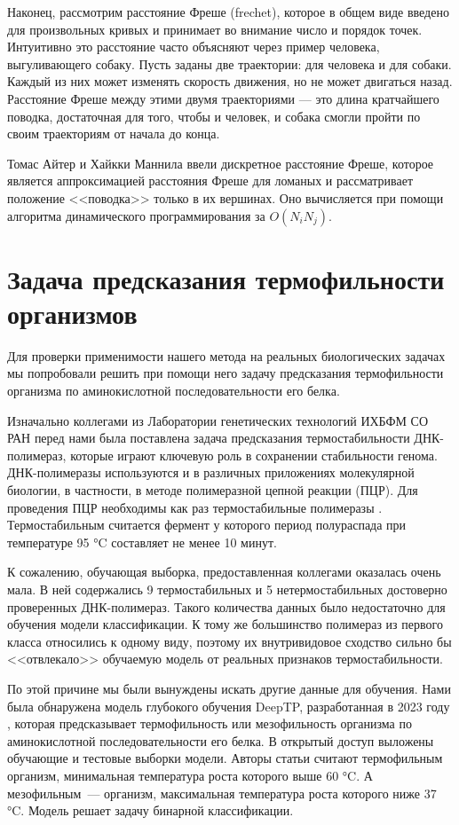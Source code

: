 Наконец, рассмотрим расстояние Фреше (frechet), которое в общем виде введено для произвольных кривых и принимает во внимание число и порядок точек. Интуитивно это расстояние часто объясняют через пример человека, выгуливающего собаку. Пусть заданы две траектории: для человека и для собаки. Каждый из них может изменять скорость движения, но не может двигаться назад. Расстояние Фреше между этими двумя траекториями --- это длина кратчайшего поводка, достаточная для того, чтобы и человек, и собака смогли пройти по своим траекториям от начала до конца.

Томас Айтер и Хайкки Маннила ввели \cite{Eiter1994ComputingDF} дискретное расстояние Фреше, которое является аппроксимацией расстояния Фреше для ломаных и рассматривает положение <<поводка>> только в их вершинах. Оно вычисляется при помощи алгоритма динамического программирования за $O(N_iN_j)$.

\section{Задача предсказания термофильности организмов}

Для проверки применимости нашего метода на реальных биологических задачах мы попробовали решить при помощи него задачу предсказания термофильности организма по аминокислотной последовательности его белка.

Изначально коллегами из Лаборатории генетических технологий ИХБФМ СО РАН перед нами была поставлена задача предсказания термостабильности ДНК-полимераз, которые играют ключевую роль в сохранении стабильности генома. ДНК-полимеразы используются и в различных приложениях молекулярной биологии, в частности, в методе полимеразной цепной реакции (ПЦР). Для проведения ПЦР необходимы как раз термостабильные полимеразы \cite{bulygin}. Термостабильным считается фермент у которого период полураспада при температуре 95 °C составляет не менее 10 минут.

К сожалению, обучающая выборка, предоставленная коллегами оказалась очень мала. В ней содержались 9 термостабильных и 5 нетермостабильных достоверно проверенных ДНК-полимераз. Такого количества данных было недостаточно для обучения модели классификации. К тому же большинство полимераз из первого класса относились к одному виду, поэтому их внутривидовое сходство сильно бы <<отвлекало>> обучаемую модель от реальных признаков термостабильности.

По этой причине мы были вынуждены искать другие данные для обучения. Нами была обнаружена модель глубокого обучения DeepTP, разработанная в 2023 году \cite{Zhao2023}, которая предсказывает термофильность или мезофильность организма по аминокислотной последовательности его белка. В открытый доступ выложены обучающие и тестовые выборки модели. Авторы статьи считают термофильным организм, минимальная температура роста которого выше 60 °C. А мезофильным~--- организм, максимальная температура роста которого ниже 37 °C. Модель решает задачу бинарной классификации.

